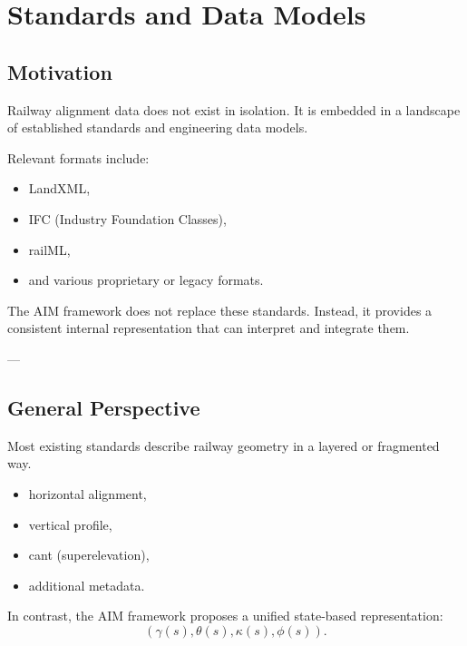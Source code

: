 \chapter{Standards and Data Models}

\section{Motivation}

\begin{remark}
Railway alignment data does not exist in isolation. It is embedded in a
landscape of established standards and engineering data models.
\end{remark}

\begin{remark}
Relevant formats include:
\begin{itemize}
\item LandXML,
\item IFC (Industry Foundation Classes),
\item railML,
\item and various proprietary or legacy formats.
\end{itemize}
\end{remark}

\begin{remark}
The AIM framework does not replace these standards. Instead, it provides
a consistent internal representation that can interpret and integrate
them.
\end{remark}

---

\section{General Perspective}

\begin{remark}
Most existing standards describe railway geometry in a layered or
fragmented way.
\end{remark}

\begin{itemize}
\item horizontal alignment,
\item vertical profile,
\item cant (superelevation),
\item additional metadata.
\end{itemize}

\begin{remark}
In contrast, the AIM framework proposes a unified state-based
representation:
\[
(\gamma(s), \theta(s), \kappa(s), \phi(s)).
\]
\end{remark}

